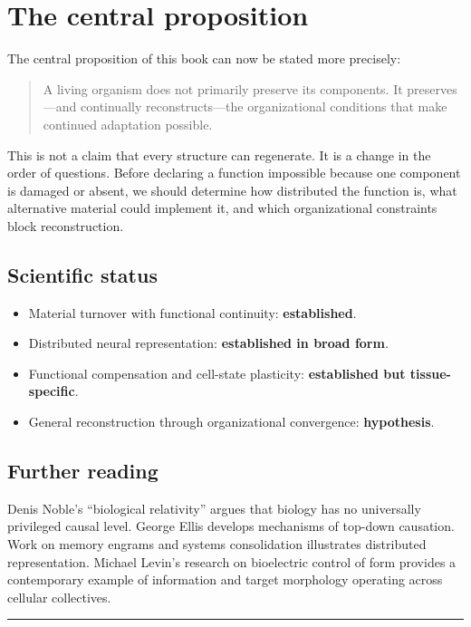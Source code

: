 \section{The central proposition}

The central proposition of this book can now be stated more precisely:

\begin{quote}
A living organism does not primarily preserve its components. It preserves---and continually reconstructs---the organizational conditions that make continued adaptation possible.
\end{quote}

This is not a claim that every structure can regenerate. It is a change in the order of questions. Before declaring a function impossible because one component is damaged or absent, we should determine how distributed the function is, what alternative material could implement it, and which organizational constraints block reconstruction.

\subsection{Scientific status}

\begin{itemize}
\tightlist
\item
  Material turnover with functional continuity: \textbf{established}.
\item
  Distributed neural representation: \textbf{established in broad form}.
\item
  Functional compensation and cell-state plasticity: \textbf{established but tissue-specific}.
\item
  General reconstruction through organizational convergence: \textbf{hypothesis}.
\end{itemize}

\subsection{Further reading}

Denis Noble's ``biological relativity'' argues that biology has no universally privileged causal level. George Ellis develops mechanisms of top-down causation. Work on memory engrams and systems consolidation illustrates distributed representation. Michael Levin's research on bioelectric control of form provides a contemporary example of information and target morphology operating across cellular collectives.

\begin{center}\rule{0.5\linewidth}{0.5pt}\end{center}
